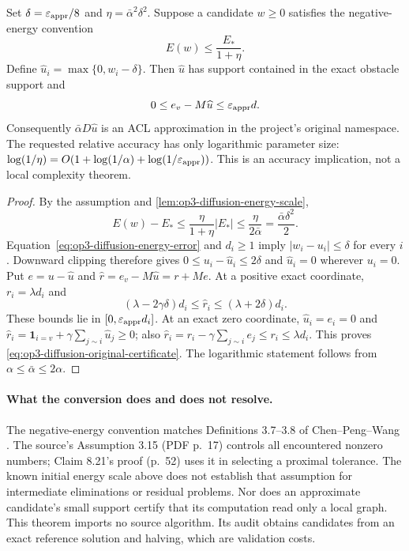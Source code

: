\begin{theorem}
\label{thm:op3-diffusion-accuracy-bridge}
Set $\delta=\varepsilon_{\mathrm{appr}}/8$ and $\eta=\bar\alpha^2\delta^2$.
Suppose a candidate $w\geq0$ satisfies the negative-energy convention
\begin{equation}
 E(w)\leq\frac{E_*}{1+\eta}.
 \label{eq:op3-diffusion-relative-interface}
\end{equation}
Define $\widehat u_i=\max\{0,w_i-\delta\}$.
Then $\widehat u$ has support contained in the exact obstacle support and
\begin{equation}
 0\leq e_v-M\widehat u\leq\varepsilon_{\mathrm{appr}} d.
 \label{eq:op3-diffusion-original-certificate}
\end{equation}
Consequently $\bar\alpha D\widehat u$ is an ACL approximation in the
project's original namespace. The requested relative accuracy has only
logarithmic parameter size:
$\log(1/\eta)=O(1+\log(1/\alpha)+\log(1/\varepsilon_{\mathrm{appr}}))$.
This is an accuracy implication, not a local complexity theorem.
\end{theorem}
\begin{proof}
By the assumption and \cref{lem:op3-diffusion-energy-scale},
\[
 E(w)-E_*\leq\frac{\eta}{1+\eta}|E_*|
 \leq\frac{\eta}{2\bar\alpha}
 =\frac{\bar\alpha\delta^2}{2}.
\]
Equation~\eqref{eq:op3-diffusion-energy-error} and $d_i\geq1$ imply
$|w_i-u_i|\leq\delta$ for every $i$. Downward clipping therefore gives
$0\leq u_i-\widehat u_i\leq2\delta$ and $\widehat u_i=0$ wherever
$u_i=0$. Put $e=u-\widehat u$ and $\widehat r=e_v-M\widehat u=r+Me$.
At a positive exact coordinate, $r_i=\lambda d_i$ and
\[
 (\lambda-2\gamma\delta)d_i\leq\widehat r_i
 \leq(\lambda+2\delta)d_i.
\]
These bounds lie in $[0,\varepsilon_{\mathrm{appr}} d_i]$. At an exact zero coordinate,
$\widehat u_i=e_i=0$ and
$\widehat r_i=\mathbf1_{i=v}+\gamma\sum_{j\sim i}\widehat u_j\geq0$;
also $\widehat r_i=r_i-\gamma\sum_{j\sim i}e_j\leq r_i\leq\lambda d_i$.
This proves \cref{eq:op3-diffusion-original-certificate}. The logarithmic
statement follows from $\alpha\leq\bar\alpha\leq2\alpha$.
\end{proof}

\paragraph{What the conversion does and does not resolve.}
The negative-energy convention matches Definitions 3.7--3.8 of
Chen--Peng--Wang \citep{chen2021diffusion}. The source's Assumption 3.15
(PDF p.\ 17) controls all encountered nonzero numbers; Claim 8.21's proof
(p.\ 52) uses it in selecting a proximal tolerance. The known initial
energy scale above does not establish that assumption for intermediate
eliminations or residual problems. Nor does an approximate candidate's
small support certify that its computation read only a local graph.
This theorem imports no source algorithm. Its audit obtains candidates
from an exact reference solution and halving, which are validation costs.

